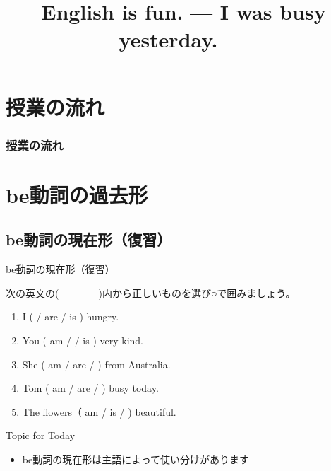 \documentclass[aspectratio=169,xcolor={dvipsnames,table}]{beamer}
\title{English is fun.\,\,{}--- I was busy yesterday. ---}
\author{}
\institute[]{}
\date[]
\newcommand{\myaudio}[1]{\href{#1}{\faVolumeUp}}
\begin{document}
\begin{frame}[plain]
  \titlepage
\end{frame}

\section*{授業の流れ}
\begin{frame}[plain]
  \frametitle{授業の流れ}
  \tableofcontents
\end{frame}

\section{be動詞の過去形}

\subsection{be動詞の現在形（復習）}

\begin{frame}[plain]{be動詞の現在形（復習）}

次の英文の(~~~~~~~~)内から正しいものを選び○で囲みましょう。

\begin{enumerate}
 \item I (  / are  / is ) hungry.
 \item You ( am /  / is ) very kind.
 \item She ( am / are /  ) from Australia.
 \item Tom ( am / are /  ) busy today.
 \item The flowers（ am / is /  ) beautiful.
\end{enumerate}

\hfill\myaudio{./audio/024_past_be_01.pdf}

\begin{exampleblock}{Topic for Today}
\pause
\begin{itemize}\small
 \item be動詞の現在形は主語によって使い分けがあります
\end{itemize}
     \end{exampleblock}

\end{frame}
\end{document}
